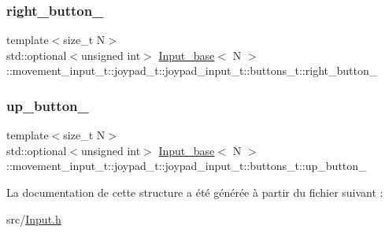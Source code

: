 \subsubsection{\texorpdfstring{right\+\_\+button\+\_\+}{right\_button\_}}
{\footnotesize\ttfamily template$<$size\+\_\+t N$>$ \\
std\+::optional$<$unsigned int$>$ \hyperlink{class_input__base}{Input\+\_\+base}$<$ N $>$\+::movement\+\_\+input\+\_\+t\+::joypad\+\_\+t\+::joypad\+\_\+input\+\_\+t\+::buttons\+\_\+t\+::right\+\_\+button\+\_\+}

\mbox{\label{struct_input__base_1_1movement__input__t_1_1joypad__t_1_1joypad__input__t_1_1buttons__t_a239929c919634205fe86f61208515848}} 
\subsubsection{\texorpdfstring{up\+\_\+button\+\_\+}{up\_button\_}}
{\footnotesize\ttfamily template$<$size\+\_\+t N$>$ \\
std\+::optional$<$unsigned int$>$ \hyperlink{class_input__base}{Input\+\_\+base}$<$ N $>$\+::movement\+\_\+input\+\_\+t\+::joypad\+\_\+t\+::joypad\+\_\+input\+\_\+t\+::buttons\+\_\+t\+::up\+\_\+button\+\_\+}



La documentation de cette structure a été générée à partir du fichier suivant \+:\begin{DoxyCompactItemize}
\item 
src/\hyperlink{_input_8h}{Input.\+h}\end{DoxyCompactItemize}
